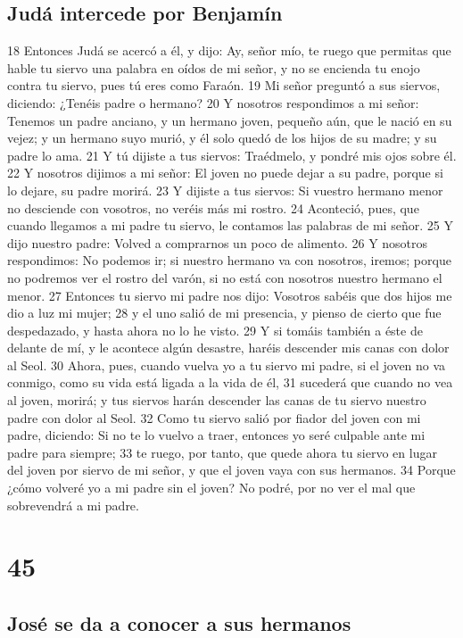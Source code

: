 \section*{Judá intercede por Benjamín}

18 Entonces Judá se acercó a él, y dijo: Ay, señor mío, te ruego que permitas que hable tu siervo una palabra en oídos de mi señor, y no se encienda tu enojo contra tu siervo, pues tú eres como Faraón.
19 Mi señor preguntó a sus siervos, diciendo: ¿Tenéis padre o hermano?
20 Y nosotros respondimos a mi señor: Tenemos un padre anciano, y un hermano joven, pequeño aún, que le nació en su vejez; y un hermano suyo murió, y él solo quedó de los hijos de su madre; y su padre lo ama.
21 Y tú dijiste a tus siervos: Traédmelo, y pondré mis ojos sobre él.
22 Y nosotros dijimos a mi señor: El joven no puede dejar a su padre, porque si lo dejare, su padre morirá.
23 Y dijiste a tus siervos: Si vuestro hermano menor no desciende con vosotros, no veréis más mi rostro.
24 Aconteció, pues, que cuando llegamos a mi padre tu siervo, le contamos las palabras de mi señor.
25 Y dijo nuestro padre: Volved a comprarnos un poco de alimento.
26 Y nosotros respondimos: No podemos ir; si nuestro hermano va con nosotros, iremos; porque no podremos ver el rostro del varón, si no está con nosotros nuestro hermano el menor.
27 Entonces tu siervo mi padre nos dijo: Vosotros sabéis que dos hijos me dio a luz mi mujer;
28 y el uno salió de mi presencia, y pienso de cierto que fue despedazado, y hasta ahora no lo he visto.
29 Y si tomáis también a éste de delante de mí, y le acontece algún desastre, haréis descender mis canas con dolor al Seol.
30 Ahora, pues, cuando vuelva yo a tu siervo mi padre, si el joven no va conmigo, como su vida está ligada a la vida de él,
31 sucederá que cuando no vea al joven, morirá; y tus siervos harán descender las canas de tu siervo nuestro padre con dolor al Seol.
32 Como tu siervo salió por fiador del joven con mi padre, diciendo: Si no te lo vuelvo a traer, entonces yo seré culpable ante mi padre para siempre;
33 te ruego, por tanto, que quede ahora tu siervo en lugar del joven por siervo de mi señor, y que el joven vaya con sus hermanos.
34 Porque ¿cómo volveré yo a mi padre sin el joven? No podré, por no ver el mal que sobrevendrá a mi padre.

\chapter{45}

\section*{José se da a conocer a sus hermanos}

